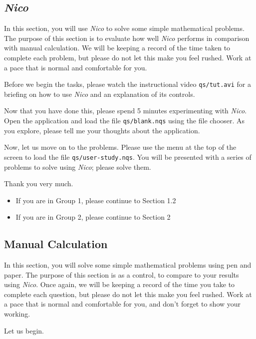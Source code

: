 \documentclass[14pt]{article}
\begin{document}
\subsection{\emph{Nico}}

In this section, you will use \emph{Nico} to solve some simple mathematical
problems.  The purpose of this section is to evaluate how well \emph{Nico}
performs in comparison with manual calculation.  We will be keeping a record of
the time taken to complete each problem, but please do not let this make you feel
rushed.  Work at a pace that is normal and comfortable for you.

Before we begin the tasks, please watch the instructional video
\verb¬qs/tut.avi¬ for a briefing on how to use \emph{Nico} and an explanation
of its controls.

Now that you have done this, please spend 5 minutes experimenting with
\emph{Nico}.  Open the application and load the file \verb¬qs/blank.nqs¬ using
the file chooser.  As you explore, please tell me your thoughts about the
application.

Now, let us move on to the problems.  Please use the {} menu
at the top of the screen to load the file \verb¬qs/user-study.nqs¬.  You will
be presented with a series of problems to solve using \emph{Nico}; please solve
them.

Thank you very much.

\begin{itemize}
\item If you are in Group 1, please continue to Section 1.2
\item If you are in Group 2, please continue to Section 2
\end{itemize}

\subsection{Manual Calculation}

In this section, you will solve some simple mathematical problems using pen
and paper.  The purpose of this section is as a control, to compare to your
results using \emph{Nico}.  Once again, we will be keeping a record of the time
you take to complete each question, but please do not let this make you feel
rushed.  Work at a pace that is normal and comfortable for you, and don't forget
to show your working.

Let us begin.

\end{document}
